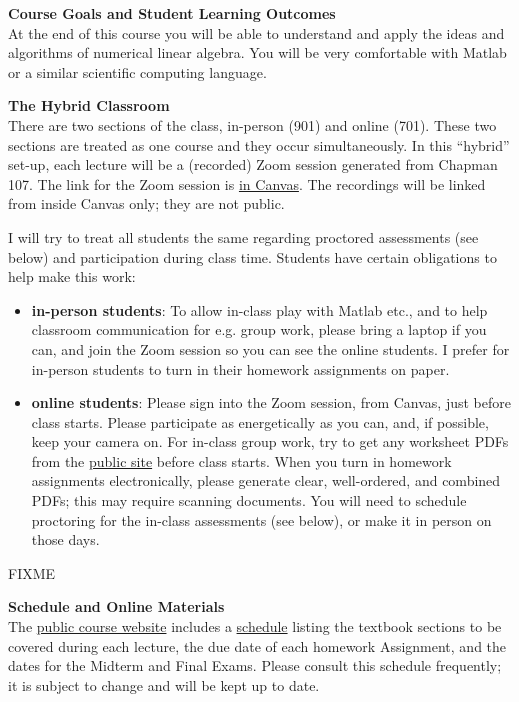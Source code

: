 \documentclass[12pt]{article}
\renewcommand{\emph}[1]{\textsf{\textbf{#1}}}
\newcommand{\localhead}[1]{\par\smallskip\textbf{#1} \smallskip\nobreak\\}%
\def\heading#1{\localhead{\large\emph{#1}}}
\begin{document}
\heading{Course Goals and Student Learning Outcomes}
At the end of this course you will be able to understand and apply the ideas and algorithms of numerical linear algebra.  You will be very comfortable with Matlab or a similar scientific computing language.


\heading{The Hybrid Classroom}
There are two sections of the class, in-person (901) and online (701).  These two sections are treated as one course and they occur simultaneously.  In this ``hybrid'' set-up, each lecture will be a (recorded) Zoom session generated from Chapman 107.  The link for the Zoom session is \href{https://canvas.alaska.edu/courses/15800}{in Canvas}.  The recordings will be linked from inside Canvas only; they are not public.

I will try to treat all students the same regarding proctored assessments (see below) and participation during class time.  Students have certain obligations to help make this work:
\begin{itemize}
\item \textbf{in-person students}: To allow in-class play with Matlab etc., and to help classroom communication for e.g. group work, please bring a laptop if you can, and join the Zoom session so you can see the online students.  I prefer for in-person students to turn in their homework assignments on paper.
\item \textbf{online students}: Please sign into the Zoom session, from Canvas, just before class starts.  Please participate as energetically as you can, and, if possible, keep your camera on.  For in-class group work, try to get any worksheet PDFs from the \href{https://bueler.github.io/nla/}{public site} before class starts.  When you turn in homework assignments electronically, please generate clear, well-ordered, and combined PDFs; this may require scanning documents.  You will need to schedule proctoring for the in-class assessments (see below), or make it in person on those days.
\end{itemize}

FIXME

\heading{Schedule and Online Materials}
The \href{https://bueler.github.io/nade/}{public course website} includes a \href{https://bueler.github.io/nade/assets/general/S23/schedule.pdf}{schedule} listing the textbook sections to be covered during each lecture, the due date of each homework Assignment, and the dates for the Midterm and Final Exams.  Please consult this schedule frequently; it is subject to change and will be kept up to date.
\end{document}
